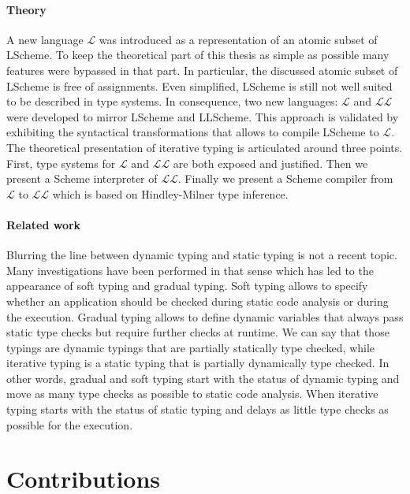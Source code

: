 \documentclass[a4paper]{report}
\newcommand{\lang}[0]{\mathcal{L}}
\begin{document}
\paragraph{Theory} A new language $\lang$ was introduced as a representation of an atomic subset of LScheme. To keep the theoretical part of this thesis as simple as possible many features were bypassed in that part. In particular, the discussed atomic subset of LScheme is free of assignments. Even simplified, LScheme is still not well suited to be described in type systems. In consequence, two new languages: $\lang$ and $\lang\lang$ were developed to mirror LScheme and LLScheme. This approach is validated by exhibiting the syntactical transformations that allows to compile LScheme to $\lang$. The theoretical presentation of iterative typing is articulated around three points. First, type systems for $\lang$ and $\lang\lang$ are both exposed and justified. Then we present a Scheme interpreter of $\lang\lang$. Finally we present a Scheme compiler from $\lang$ to $\lang\lang$ which is based on Hindley-Milner type inference\cite{hm1}.

\paragraph{Related work} Blurring the line between dynamic typing and static typing is not a recent topic. Many investigations have been performed in that sense which has led to the appearance of soft typing and gradual typing. Soft typing allows to specify whether an application should be checked during static code analysis or during the execution\cite{soft1}. Gradual typing allows to define dynamic variables that always pass static type checks but require further checks at runtime\cite{grad3}. We can say that those typings are dynamic typings that are partially statically type checked, while iterative typing is a static typing that is partially dynamically type checked. In other words, gradual and soft typing start with the status of dynamic typing and move as many type checks as possible to static code analysis. When iterative typing starts with the status of static typing and delays as little type checks as possible for the execution.

\section{Contributions} 
\end{document}
